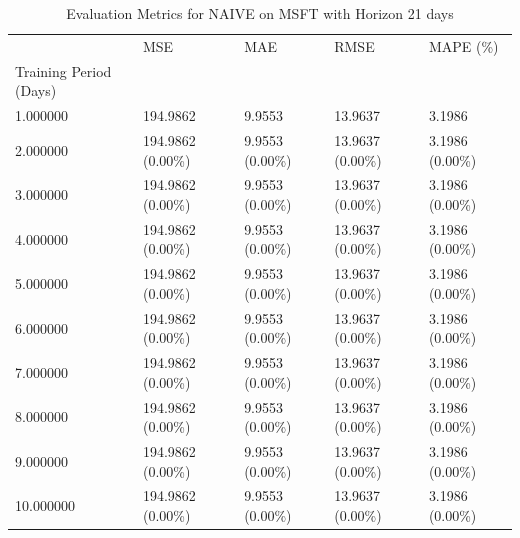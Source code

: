 \begin{table}
\caption{Evaluation Metrics for NAIVE on MSFT with Horizon 21 days}
\label{tab:naive_MSFT_h21_metrics}
\begin{tabular}{lllll}
\toprule
 & MSE & MAE & RMSE & MAPE (\%) \\
Training Period (Days) &  &  &  &  \\
\midrule
1.000000 & 194.9862 & 9.9553 & 13.9637 & 3.1986 \\
2.000000 & 194.9862 (0.00\%) & 9.9553 (0.00\%) & 13.9637 (0.00\%) & 3.1986 (0.00\%) \\
3.000000 & 194.9862 (0.00\%) & 9.9553 (0.00\%) & 13.9637 (0.00\%) & 3.1986 (0.00\%) \\
4.000000 & 194.9862 (0.00\%) & 9.9553 (0.00\%) & 13.9637 (0.00\%) & 3.1986 (0.00\%) \\
5.000000 & 194.9862 (0.00\%) & 9.9553 (0.00\%) & 13.9637 (0.00\%) & 3.1986 (0.00\%) \\
6.000000 & 194.9862 (0.00\%) & 9.9553 (0.00\%) & 13.9637 (0.00\%) & 3.1986 (0.00\%) \\
7.000000 & 194.9862 (0.00\%) & 9.9553 (0.00\%) & 13.9637 (0.00\%) & 3.1986 (0.00\%) \\
8.000000 & 194.9862 (0.00\%) & 9.9553 (0.00\%) & 13.9637 (0.00\%) & 3.1986 (0.00\%) \\
9.000000 & 194.9862 (0.00\%) & 9.9553 (0.00\%) & 13.9637 (0.00\%) & 3.1986 (0.00\%) \\
10.000000 & 194.9862 (0.00\%) & 9.9553 (0.00\%) & 13.9637 (0.00\%) & 3.1986 (0.00\%) \\
\bottomrule
\end{tabular}
\end{table}
